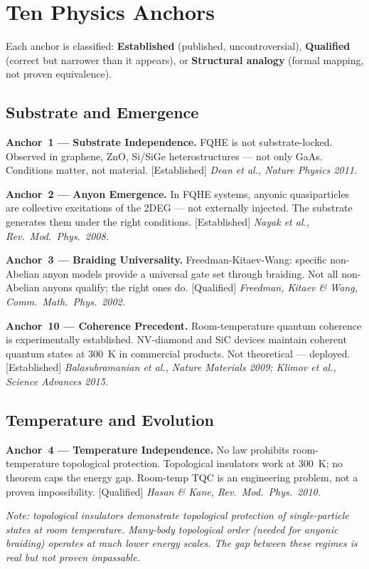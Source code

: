 \section*{Ten Physics Anchors}

Each anchor is classified: \textbf{Established} (published, uncontroversial), \textbf{Qualified} (correct but narrower than it appears), or \textbf{Structural analogy} (formal mapping, not proven equivalence).

\subsection*{Substrate and Emergence}

\textbf{Anchor~1 --- Substrate Independence.} FQHE is not substrate-locked. Observed in graphene, ZnO, Si/SiGe heterostructures --- not only GaAs. Conditions matter, not material. [Established]
\textit{Dean et al., Nature Physics 2011.}

\textbf{Anchor~2 --- Anyon Emergence.} In FQHE systems, anyonic quasiparticles are collective excitations of the 2DEG --- not externally injected. The substrate generates them under the right conditions. [Established]
\textit{Nayak et al., Rev.\ Mod.\ Phys.\ 2008.}

\textbf{Anchor~3 --- Braiding Universality.} Freedman-Kitaev-Wang: specific non-Abelian anyon models provide a universal gate set through braiding. Not all non-Abelian anyons qualify; the right ones do. [Qualified]
\textit{Freedman, Kitaev \& Wang, Comm.\ Math.\ Phys.\ 2002.}

\textbf{Anchor~10 --- Coherence Precedent.} Room-temperature quantum coherence is experimentally established. NV-diamond and SiC devices maintain coherent quantum states at 300~K in commercial products. Not theoretical --- deployed. [Established]
\textit{Balasubramanian et al., Nature Materials 2009; Klimov et al., Science Advances 2015.}

\subsection*{Temperature and Evolution}

\textbf{Anchor~4 --- Temperature Independence.} No law prohibits room-temperature topological protection. Topological insulators work at 300~K; no theorem caps the energy gap. Room-temp TQC is an engineering problem, not a proven impossibility. [Qualified]
\textit{Hasan \& Kane, Rev.\ Mod.\ Phys.\ 2010.}

\noindent\textit{Note: topological insulators demonstrate topological protection of single-particle states at room temperature. Many-body topological order (needed for anyonic braiding) operates at much lower energy scales. The gap between these regimes is real but not proven impassable.}

